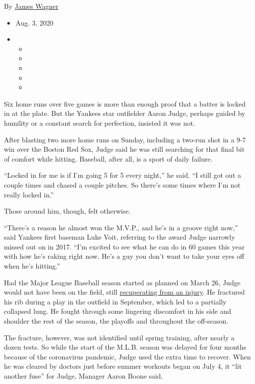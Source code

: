 By \href{https://www.nytimes3xbfgragh.onion/by/james-wagner}{James
Wagner}

\begin{itemize}
\item
  Aug. 3, 2020
\item
  \begin{itemize}
  \item
  \item
  \item
  \item
  \item
  \end{itemize}
\end{itemize}

Six home runs over five games is more than enough proof that a batter is
locked in at the plate. But the Yankees star outfielder Aaron Judge,
perhaps guided by humility or a constant search for perfection, insisted
it was not.

After blasting two more home runs on Sunday, including a two-run shot in
a 9-7 win over the Boston Red Sox, Judge said he was still searching for
that final bit of comfort while hitting. Baseball, after all, is a sport
of daily failure.

``Locked in for me is if I'm going 5 for 5 every night,'' he said. ``I
still got out a couple times and chased a couple pitches. So there's
some times where I'm not really locked in.''

Those around him, though, felt otherwise.

``There's a reason he almost won the M.V.P., and he's in a groove right
now,'' said Yankees first baseman Luke Voit, referring to the award
Judge narrowly missed out on in 2017. ``I'm excited to see what he can
do in 60 games this year with how he's raking right now. He's a guy you
don't want to take your eyes off when he's hitting.''

Had the Major League Baseball season started as planned on March 26,
Judge would not have been on the field, still
\href{https://www.nytimes3xbfgragh.onion/2020/03/06/sports/baseball/aaron-judge-yankees.html}{recuperating
from an injury}. He fractured his rib during a play in the outfield in
September, which led to a partially collapsed lung. He fought through
some lingering discomfort in his side and shoulder the rest of the
season, the playoffs and throughout the off-season.

The fracture, however, was not identified until spring training, after
nearly a dozen tests. So while the start of the M.L.B. season was
delayed for four months because of the coronavirus pandemic, Judge used
the extra time to recover. When he was cleared by doctors just before
summer workouts began on July 4, it ``lit another fuse'' for Judge,
Manager Aaron Boone said.

